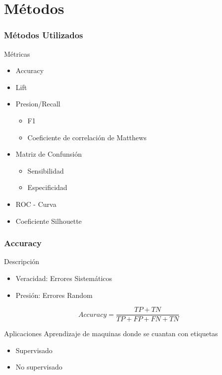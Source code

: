 \documentclass{beamer}
\begin{document}
\section{M\'etodos}
\begin{frame}
  \frametitle{M\'etodos Utilizados}

  \begin{block}{M\'etricas}
	\begin{itemize}
	\item Accuracy
	\item Lift
	\item Presion/Recall
	\begin{itemize}
		\item F1
		\item Coeficiente de correlaci\'on de Matthews
	\end{itemize}
	\item Matriz de Confunsi\'on
	\begin{itemize}
		\item Sensibilidad
		\item Especificidad
	\end{itemize}
	\item ROC - Curva
	\item Coeficiente Silhouette
	\end{itemize}		
	\end{block}
\end{frame}


\begin{frame}
  \frametitle{Accuracy}

  \begin{block}{Descripci\'on}
  \begin{itemize}
  \item Veracidad: Errores Sistem\'aticos
  \item Presi\'on: Errores Random
   
  \end{itemize}
  	
  	\[Accuracy= \dfrac{TP+TN}{TP+FP+FN+TN} \] 
  \end{block}
  \begin{block}{Aplicaciones}
  	Aprendizaje de maquinas donde se cuantan con etiquetas
  	\begin{itemize}
  \item Supervisado
  \item No supervisado
   
  \end{itemize}
  \end{block}
\end{frame}
\end{document}
